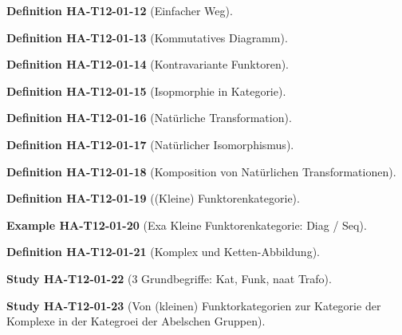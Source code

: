 \documentclass[10pt, letterpaper]{article}
\newcommand{\CustomHeading}[3]{%
  \par\medskip\noindent%
  \textbf{#1 #2} \textnormal{(#3)}.\enskip%
}
\newenvironment{DEF}[2]{\CustomHeading{Definition}{#1}{#2}}{}
\newenvironment{EXA}[2]{\CustomHeading{Example}{#1}{#2}}{}
\newenvironment{STUD}[2]{\CustomHeading{Study}{#1}{#2}}{}
\begin{document}
\begin{DEF}{HA-T12-01-12}{Einfacher Weg}
\end{DEF}

\begin{DEF}{HA-T12-01-13}{Kommutatives Diagramm}
\end{DEF}

\begin{DEF}{HA-T12-01-14}{Kontravariante Funktoren}
\end{DEF}

\begin{DEF}{HA-T12-01-15}{Isopmorphie in Kategorie}
\end{DEF}

\begin{DEF}{HA-T12-01-16}{Natürliche Transformation}
\end{DEF}

\begin{DEF}{HA-T12-01-17}{Natürlicher Isomorphismus}
\end{DEF}

\begin{DEF}{HA-T12-01-18}{Komposition von Natürlichen Transformationen}
\end{DEF}

\begin{DEF}{HA-T12-01-19}{(Kleine) Funktorenkategorie}
\end{DEF}

\begin{EXA}{HA-T12-01-20}{Exa Kleine Funktorenkategorie: Diag / Seq}
\end{EXA}

\begin{DEF}{HA-T12-01-21}{Komplex und Ketten-Abbildung}
\end{DEF}

\begin{STUD}{HA-T12-01-22}{3 Grundbegriffe: Kat, Funk, naat Trafo}
\end{STUD}

\begin{STUD}{HA-T12-01-23}{Von (kleinen) Funktorkategorien zur Kategorie der Komplexe in der Kategroei der Abelschen Gruppen}
\end{STUD}
\end{document}
